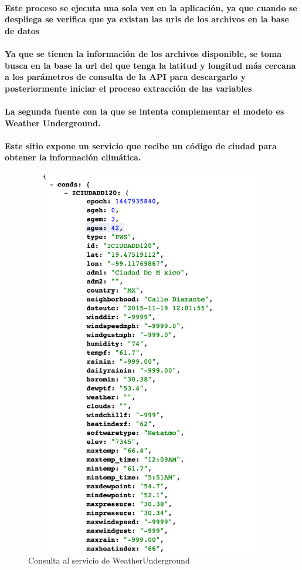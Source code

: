     \paragraph{Este proceso se ejecuta una sola vez en la aplicación, ya que cuando se despliega se verifica que ya existan las urls de los archivos en la base de datos}
    \paragraph{Ya que se tienen la información de los archivos disponible, se toma busca en la base la url del que tenga la latitud y longitud más cercana a los parámetros de consulta de la API para descargarlo y posteriormente iniciar el proceso extracción de las variables} 
    \paragraph{La segunda fuente con la que se intenta complementar el modelo es Weather Underground.}
    \paragraph{Este sitio expone un servicio que recibe un código de ciudad para obtener la información climática.}
    \begin{figure}[b!]
    \begin{center}
      \includegraphics[width=12cm,height=17cm]{./images/WeatherUnderground}
      \caption{Consulta al servicio de WeatherUnderground}
    \end{center}
    \end{figure}
